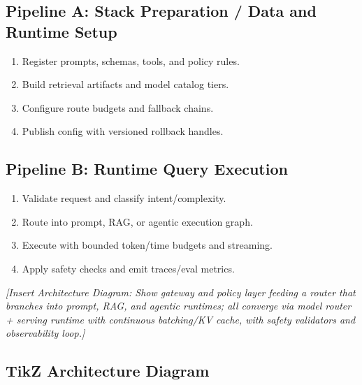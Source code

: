 \subsection*{Pipeline A: Stack Preparation / Data and Runtime Setup}
\begin{enumerate}
  \item Register prompts, schemas, tools, and policy rules.
  \item Build retrieval artifacts and model catalog tiers.
  \item Configure route budgets and fallback chains.
  \item Publish config with versioned rollback handles.
\end{enumerate}

\subsection*{Pipeline B: Runtime Query Execution}
\begin{enumerate}
  \item Validate request and classify intent/complexity.
  \item Route into prompt, RAG, or agentic execution graph.
  \item Execute with bounded token/time budgets and streaming.
  \item Apply safety checks and emit traces/eval metrics.
\end{enumerate}

\textit{[Insert Architecture Diagram: Show gateway and policy layer feeding a router that branches into prompt, RAG, and agentic runtimes; all converge via model router + serving runtime with continuous batching/KV cache, with safety validators and observability loop.]}

\subsection*{TikZ Architecture Diagram}
\begin{center}
\end{center}

